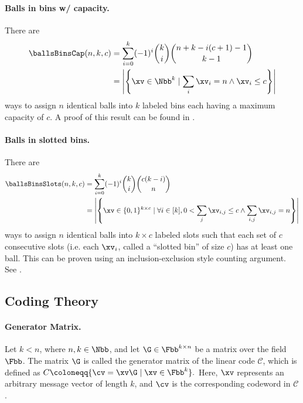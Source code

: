 \paragraph{Balls in bins w/ capacity.} There are
\begin{align*}
    \ballsBinsCap(n,k,c) &= \sum_{i=0}^k (-1)^i {k \choose i} {n+k -i (c+1)-1 \choose k-1}\\
    &=\left|\left\{ \xv\in \Nbb^k \mid \sum_i \xv_i = n \wedge \xv_i \leq c \right\}\right|
\end{align*}
ways to assign $n$ identical balls into $k$ labeled bins each having a maximum capacity of $c$. A proof of this result can be found in \cite{bro19}.

\paragraph{Balls in slotted bins.} There are
\begin{align*}
    \ballsBinsSlots(n,k,c) &= \sum_{i=0}^k (-1)^i {k \choose i} {c(k-i) \choose n}\\
    &=\left|\left\{ \xv\in \{0,1\}^{k\times c} \mid \forall i\in [k], 0< \sum_j \xv_{i,j} \leq c \wedge \sum_{i,j}\xv_{i,j} = n \right\}\right|
\end{align*}
ways to assign $n$ identical balls into $k\times c$ labeled slots such that each set of $c$ consecutive slots (i.e. each $\xv_i$, called a ``slotted bin'' of size $c$) has at least one ball. This can be proven using an inclusion-exclusion style counting argument. See .



 \subsection{Coding Theory}\label{ssec:codingtheory}

\paragraph{Generator Matrix.}
Let $k < n$, where $n,k\in\Nbb$, and let $\G\in\Fbb^{k\times n}$ be a matrix over the field $\Fbb$. The matrix $\G$ is called the generator matrix of the linear code $\mathcal{C}$, which is defined as
\(
C \coloneqq \{ \cv = \xv\G \mid \xv \in \Fbb^k \}.
\)
Here, $\xv$ represents an arbitrary message vector of length $k$, and $\cv$ is the corresponding codeword in $\mathcal{C}$.

